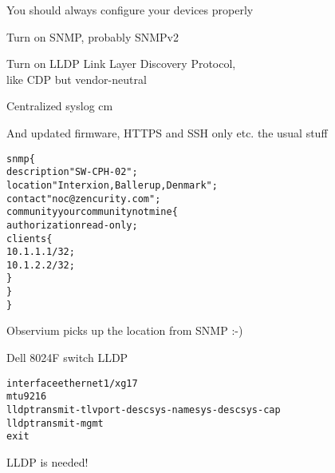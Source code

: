 \documentclass[Screen16to9,17pt]{foils}
\begin{document}







\begin{slidelist}
\item You should always configure your devices properly
\item Turn on SNMP, probably SNMPv2
\item Turn on LLDP Link Layer Discovery Protocol, \\
like CDP but vendor-neutral\\
{\small{}}
\item Centralized syslog
 cm
\item And updated firmware, HTTPS and SSH only etc. the usual stuff
\end{slidelist}



\begin{alltt}
snmp \{
    description "SW-CPH-02";
    location "Interxion, Ballerup, Denmark";
    contact "noc@zencurity.com";
    community yourcommunitynotmine \{
        authorization read-only;
        clients \{
            10.1.1.1/32;
            10.1.2.2/32;
        \}
    \}
\}
\end{alltt}



\centerline{Observium picks up the location from SNMP :-)}


Dell 8024F switch LLDP


\begin{alltt}\small
interface ethernet 1/xg17
mtu 9216
lldp transmit-tlv port-desc sys-name sys-desc sys-cap
lldp transmit-mgmt
exit
\end{alltt}


\centerline{LLDP is needed!}

\end{document}
